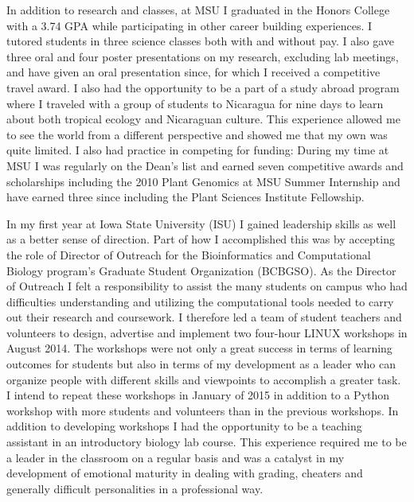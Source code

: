 \documentclass[12pt]{amsart}
\newcommand{\mbh}[1]{\textcolor{red}{ \emph{\scriptsize  #1}} }
\begin{document}
In addition to research and classes, at MSU I graduated in the Honors College with a 3.74 GPA while participating in other career building experiences.  
I tutored students in three science classes both with and without pay.
I also gave three oral and four poster presentations on my research, excluding lab meetings, and have given an oral presentation since, for which I received a competitive travel award. %
I also had the opportunity to be a part of a study abroad program where I traveled with a group of students to Nicaragua for nine days to learn about both tropical ecology and Nicaraguan culture. 
This experience allowed me to see the world from a different perspective and showed me that my own was quite limited.
I also had practice in competing for funding:
During my time at MSU I was regularly on the Dean's list and earned seven competitive awards and scholarships including the 2010 Plant Genomics at MSU Summer Internship and have earned three since including the Plant Sciences Institute Fellowship. %

In my first year at Iowa State University (ISU) I gained leadership skills as well as a better sense of direction.  
Part of how I accomplished this was by accepting the role of Director of Outreach for the Bioinformatics and Computational Biology program's Graduate Student Organization (BCBGSO).
As the Director of Outreach I felt a responsibility to assist the many students on campus who had difficulties understanding and utilizing the computational tools needed to carry out their research and coursework.
I therefore led a team of student teachers and volunteers to design, advertise and implement two four-hour LINUX workshops in August 2014.
The workshops were not only a great success in terms of learning outcomes for students but also in terms of my development as a leader who can organize people with different skills and viewpoints to accomplish a greater task.
I intend to repeat these workshops in January of 2015 in addition to a Python workshop with more students and volunteers than in the previous workshops.  
In addition to developing workshops I had the opportunity to be a teaching assistant in an introductory biology lab course.
This experience required me to be a leader in the classroom on a regular basis and was a catalyst in my development of emotional maturity in dealing with grading, cheaters and generally difficult personalities in a professional way.
\end{document}
